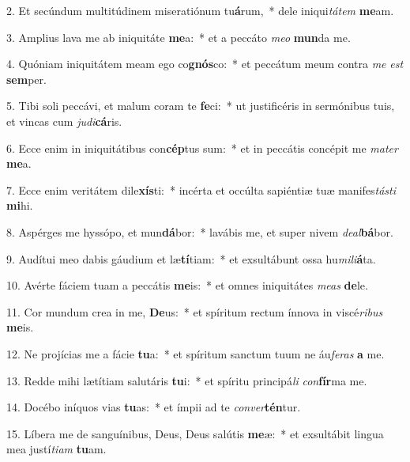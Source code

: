 
2. Et secúndum multitúdinem miseratiónum tu\textbf{á}rum,~* dele iniqui\textit{tá}\textit{tem} \textbf{me}am.

3. Amplius lava me ab iniquitáte \textbf{me}a:~* et a peccáto \textit{me}\textit{o} \textbf{mun}da me.

4. Quóniam iniquitátem meam ego co\textbf{gnós}co:~* et peccátum meum contra \textit{me} \textit{est} \textbf{sem}per.

5. Tibi soli peccávi, et malum coram te \textbf{fe}ci:~* ut justificéris in sermónibus tuis, et vincas cum \textit{ju}\textit{di}\textbf{cá}ris.

6. Ecce enim in iniquitátibus con\textbf{cép}tus sum:~* et in peccátis concépit me \textit{ma}\textit{ter} \textbf{me}a.

7. Ecce enim veritátem dile\textbf{xís}ti:~* incérta et occúlta sapiéntiæ tuæ manifes\textit{tás}\textit{ti} \textbf{mi}hi.

8. Aspérges me hyssópo, et mun\textbf{dá}bor:~* lavábis me, et super nivem \textit{de}\textit{al}\textbf{bá}bor.

9. Audítui meo dabis gáudium et læ\textbf{tí}tiam:~* et exsultábunt ossa hu\textit{mi}\textit{li}\textbf{á}ta.

10. Avérte fáciem tuam a peccátis \textbf{me}is:~* et omnes iniquitátes \textit{me}\textit{as} \textbf{de}le.

11. Cor mundum crea in me, \textbf{De}us:~* et spíritum rectum ínnova in viscé\textit{ri}\textit{bus} \textbf{me}is.

12. Ne projícias me a fácie \textbf{tu}a:~* et spíritum sanctum tuum ne áu\textit{fe}\textit{ras} \textbf{a} me.

13. Redde mihi lætítiam salutáris \textbf{tu}i:~* et spíritu principá\textit{li} \textit{con}\textbf{fír}ma me.

14. Docébo iníquos vias \textbf{tu}as:~* et ímpii ad te \textit{con}\textit{ver}\textbf{tén}tur.

15. Líbera me de sanguínibus, Deus, Deus salútis \textbf{me}æ:~* et exsultábit lingua mea justí\textit{ti}\textit{am} \textbf{tu}am.

